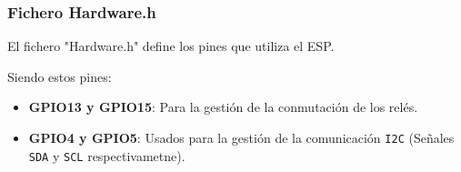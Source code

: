 \subsubsection{Fichero Hardware.h}

El fichero "Hardware.h" define los pines que utiliza el ESP. 

Siendo estos pines:
\begin{itemize}
    \item \textbf{GPIO13 y GPIO15}: Para la gestión de la conmutación de los relés. 
    \item \textbf{GPIO4 y GPIO5}: Usados para la gestión de la comunicación \texttt{I2C} (Señales \texttt{SDA} y \texttt{SCL} respectivametne). 
\end{itemize}
